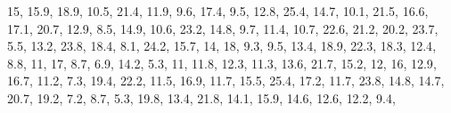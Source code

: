 \documentclass[]{book}
\newenvironment{Shaded}{\begin{snugshade}}{\end{snugshade}}
\newcommand{\DecValTok}[1]{\textcolor[rgb]{0.00,0.00,0.81}{#1}}
\newcommand{\FloatTok}[1]{\textcolor[rgb]{0.00,0.00,0.81}{#1}}
\newcommand{\NormalTok}[1]{#1}
\begin{document}
\begin{Shaded}
\begin{Highlighting}[]
    \DecValTok{15}\NormalTok{, }\FloatTok{15.9}\NormalTok{, }\FloatTok{18.9}\NormalTok{, }\FloatTok{10.5}\NormalTok{, }\FloatTok{21.4}\NormalTok{, }\FloatTok{11.9}\NormalTok{, }\FloatTok{9.6}\NormalTok{, }\FloatTok{17.4}\NormalTok{, }\FloatTok{9.5}\NormalTok{, }\FloatTok{12.8}\NormalTok{, }\FloatTok{25.4}\NormalTok{, }\FloatTok{14.7}\NormalTok{, }\FloatTok{10.1}\NormalTok{, }
    \FloatTok{21.5}\NormalTok{, }\FloatTok{16.6}\NormalTok{, }\FloatTok{17.1}\NormalTok{, }\FloatTok{20.7}\NormalTok{, }\FloatTok{12.9}\NormalTok{, }\FloatTok{8.5}\NormalTok{, }\FloatTok{14.9}\NormalTok{, }\FloatTok{10.6}\NormalTok{, }\FloatTok{23.2}\NormalTok{, }\FloatTok{14.8}\NormalTok{, }\FloatTok{9.7}\NormalTok{, }\FloatTok{11.4}\NormalTok{, }\FloatTok{10.7}\NormalTok{, }
    \FloatTok{22.6}\NormalTok{, }\FloatTok{21.2}\NormalTok{, }\FloatTok{20.2}\NormalTok{, }\FloatTok{23.7}\NormalTok{, }\FloatTok{5.5}\NormalTok{, }\FloatTok{13.2}\NormalTok{, }\FloatTok{23.8}\NormalTok{, }\FloatTok{18.4}\NormalTok{, }\FloatTok{8.1}\NormalTok{, }\FloatTok{24.2}\NormalTok{, }\FloatTok{15.7}\NormalTok{, }\DecValTok{14}\NormalTok{, }\DecValTok{18}\NormalTok{, }
    \FloatTok{9.3}\NormalTok{, }\FloatTok{9.5}\NormalTok{, }\FloatTok{13.4}\NormalTok{, }\FloatTok{18.9}\NormalTok{, }\FloatTok{22.3}\NormalTok{, }\FloatTok{18.3}\NormalTok{, }\FloatTok{12.4}\NormalTok{, }\FloatTok{8.8}\NormalTok{, }\DecValTok{11}\NormalTok{, }\DecValTok{17}\NormalTok{, }\FloatTok{8.7}\NormalTok{, }\FloatTok{6.9}\NormalTok{, }\FloatTok{14.2}\NormalTok{, }\FloatTok{5.3}\NormalTok{, }
    \DecValTok{11}\NormalTok{, }\FloatTok{11.8}\NormalTok{, }\FloatTok{12.3}\NormalTok{, }\FloatTok{11.3}\NormalTok{, }\FloatTok{13.6}\NormalTok{, }\FloatTok{21.7}\NormalTok{, }\FloatTok{15.2}\NormalTok{, }\DecValTok{12}\NormalTok{, }\DecValTok{16}\NormalTok{, }\FloatTok{12.9}\NormalTok{, }\FloatTok{16.7}\NormalTok{, }\FloatTok{11.2}\NormalTok{, }\FloatTok{7.3}\NormalTok{, }\FloatTok{19.4}\NormalTok{, }
    \FloatTok{22.2}\NormalTok{, }\FloatTok{11.5}\NormalTok{, }\FloatTok{16.9}\NormalTok{, }\FloatTok{11.7}\NormalTok{, }\FloatTok{15.5}\NormalTok{, }\FloatTok{25.4}\NormalTok{, }\FloatTok{17.2}\NormalTok{, }\FloatTok{11.7}\NormalTok{, }\FloatTok{23.8}\NormalTok{, }\FloatTok{14.8}\NormalTok{, }\FloatTok{14.7}\NormalTok{, }\FloatTok{20.7}\NormalTok{, }
    \FloatTok{19.2}\NormalTok{, }\FloatTok{7.2}\NormalTok{, }\FloatTok{8.7}\NormalTok{, }\FloatTok{5.3}\NormalTok{, }\FloatTok{19.8}\NormalTok{, }\FloatTok{13.4}\NormalTok{, }\FloatTok{21.8}\NormalTok{, }\FloatTok{14.1}\NormalTok{, }\FloatTok{15.9}\NormalTok{, }\FloatTok{14.6}\NormalTok{, }\FloatTok{12.6}\NormalTok{, }\FloatTok{12.2}\NormalTok{, }\FloatTok{9.4}\NormalTok{, }

\end{Highlighting}
\end{Shaded}
\end{document}
